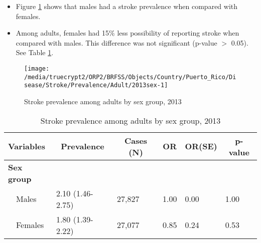 \newpage
\begin{itemize}

\item Figure \ref{fig:sex.Stroke.2013} shows that males had a 
stroke prevalence when compared with females.


\item Among adults, females had 15\% less possibility of reporting stroke when compared with males. This difference was not significant (p-value $>$ 0.05). See Table \ref{tab:sex.Stroke.2013}.

\end{itemize}

\begin{figure}[H]
\caption{Stroke prevalence among adults by sex group, 
2013}
\begin{knitrout}
\color{fgcolor}

{\centering \texttt{[image: /media/truecrypt2/ORP2/BRFSS/Objects/Country/Puerto\_Rico/Disease/Stroke/Prevalence/Adult/2013sex-1]} 

}



\end{knitrout}
\label{fig:sex.Stroke.2013}
\end{figure}

\begin{table}[H]
\caption{Stroke prevalence  among adults by sex group, 2013\label{tab:sex.Stroke.2013}} 
\begin{center}
\begin{tabular}{llllll}
\hline\hline
\multicolumn{1}{l}{Variables}&\multicolumn{1}{c}{Prevalence}&\multicolumn{1}{c}{Cases (N)}&\multicolumn{1}{c}{OR}&\multicolumn{1}{c}{OR(SE)}&\multicolumn{1}{c}{p-value}\tabularnewline
\hline
{\bfseries Sex group}&&&&&\tabularnewline
~~Males&2.10 (1.46-2.75)&27,827&1.00&0.00&1.00\tabularnewline
~~Females&1.80 (1.39-2.22)&27,077&0.85&0.24&0.53\tabularnewline
\hline
\end{tabular}\end{center}

\end{table}


